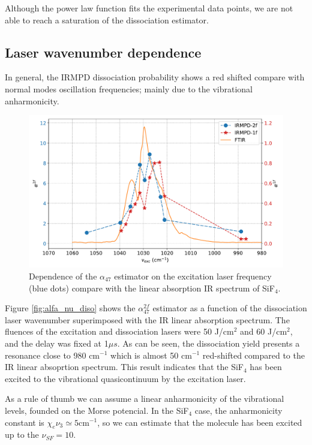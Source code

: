 \documentclass[global,twocolumn]{svjour}
\begin{document}
Although the power law function fits the experimental data points, we are not able to reach a saturation of the dissociation estimator.

\subsection{Laser wavenumber dependence}
In general, the IRMPD dissociation probability shows a red shifted compare with normal modes oscillation frequencies; mainly due to the vibrational anharmonicity.

\begin{figure}[h]
	\centering
	\includegraphics[width = 1\linewidth]{figures/alfa_47_nu_bombeo.pdf}
	\caption{\label{fig:alfa_nu_bombeo} Dependence of the $\alpha_{47}$ estimator on the excitation laser frequency (blue dots) compare with the linear absorption IR spectrum of SiF$_{4}$.}
\end{figure}

Figure \ref{fig:alfa_nu_diso} shows the $\alpha_{47}^{2f}$ estimator as a function of the dissociation laser wavenumber superimposed with the IR linear absorption spectrum. The fluences of the excitation and dissociation lasers were 50 J/cm$^{2}$ and 60 J/cm$^{2}$, and the delay was fixed at 1$\mu s$. As can be seen, the dissociation yield presents a resonance close to 980 cm$^{-1}$ which is almost 50 cm$^{-1}$ red-shifted compared to the IR linear absoprtion spectrum. This result indicates that the SiF$_{4}$ has been excited to the vibrational quasicontinuum by the excitation laser.

As a rule of thumb we can assume a linear anharmonicity of the vibrational levels, founded on the Morse potencial. In the SiF$_{4}$ case, the anharmonicity constant is $\chi_{e}\nu_{3} \simeq 5 \text{cm}^{-1}$, so we can estimate that the molecule has been excited up to the $\nu_{SF} = 10$.
\end{document}
